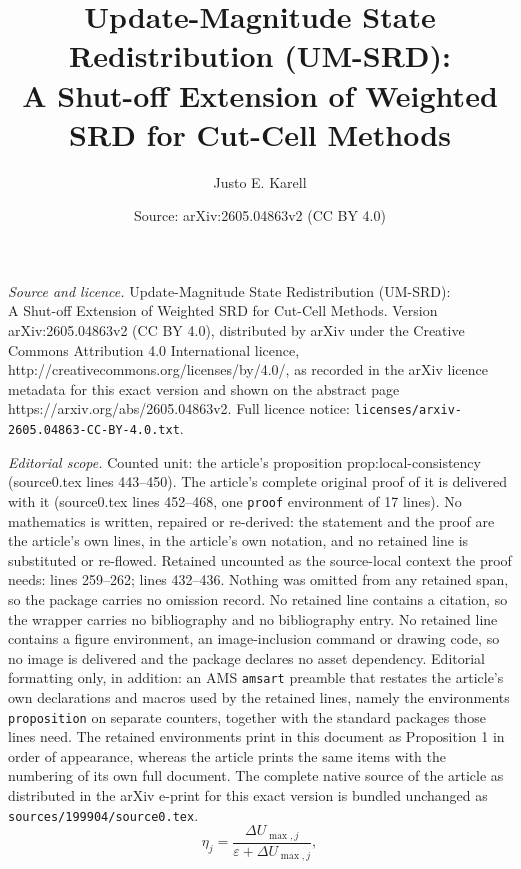 \documentclass[10pt,a4paper]{amsart}
\title{Update-Magnitude State Redistribution (UM-SRD):\\ A Shut-off Extension of Weighted SRD for Cut-Cell Methods}
\author{Justo E. Karell}
\date{Source: arXiv:2605.04863v2 (CC BY 4.0)}
\begin{document}
\maketitle

\noindent\emph{Source and licence.} Update-Magnitude State Redistribution (UM-SRD):\\ A Shut-off Extension of Weighted SRD for Cut-Cell Methods. Version arXiv:2605.04863v2 (CC BY 4.0), distributed by arXiv under the Creative Commons Attribution 4.0 International licence, http://creativecommons.org/licenses/by/4.0/, as recorded in the arXiv licence metadata for this exact version and shown on the abstract page https://arxiv.org/abs/2605.04863v2. Full licence notice: \texttt{licenses/arxiv-2605.04863-CC-BY-4.0.txt}.\par\smallskip

\noindent\textit{Editorial scope.} Counted unit: the article's proposition prop:local-consistency (source0.tex lines 443--450). The article's complete original proof of it is delivered with it (source0.tex lines 452--468, one \texttt{proof} environment of 17 lines). No mathematics is written, repaired or re-derived: the statement and the proof are the article's own lines, in the article's own notation, and no retained line is substituted or re-flowed.  Retained uncounted as the source-local context the proof needs: lines 259--262; lines 432--436.  Nothing was omitted from any retained span, so the package carries no omission record.  No retained line contains a citation, so the wrapper carries no bibliography and no bibliography entry.  No retained line contains a figure environment, an image-inclusion command or drawing code, so no image is delivered and the package declares no asset dependency.  Editorial formatting only, in addition: an AMS \texttt{amsart} preamble that restates the article's own declarations and macros used by the retained lines, namely the environments \texttt{proposition} on separate counters, together with the standard packages those lines need.  The retained environments print in this document as Proposition 1 in order of appearance, whereas the article prints the same items with the numbering of its own full document.  The complete native source of the article as distributed in the arXiv e-print for this exact version is bundled unchanged as \texttt{sources/199904/source0.tex}.
\begin{equation}
  \eta_j = \frac{\Delta U_{\max,j}}{\varepsilon + \Delta U_{\max,j}},
  \label{eq:eta}
\end{equation}
\end{document}
